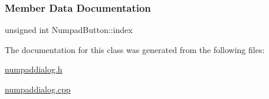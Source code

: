 \subsubsection{Member Data Documentation}
\mbox{\label{classNumpadButton_a30f48faa378ce82a0cf63f6cdd781f0b}} 
{\footnotesize\ttfamily unsigned int Numpad\+Button\+::\texorpdfstring{index}{index}\hspace{0.3cm}{\ttfamily [private]}}

The documentation for this class was generated from the following files\+:\begin{DoxyCompactItemize}
\item 
\mbox{\hyperlink{numpaddialog_8h}{numpaddialog.\+h}}\item 
\mbox{\hyperlink{numpaddialog_8cpp}{numpaddialog.\+cpp}}\end{DoxyCompactItemize}
\newpage